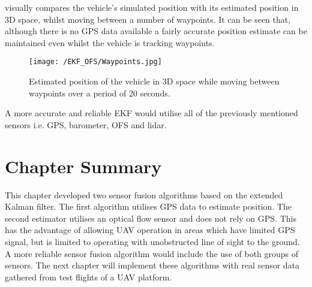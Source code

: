  visually compares the vehicle's simulated position with its estimated position in 3D space, whilst moving between a number of waypoints. It can be seen that, although there is no GPS data available a fairly accurate position estimate can be maintained even whilst the vehicle is tracking waypoints.
\begin{figure}[htb]
\begin{center}
	\texttt{[image: /EKF\_OFS/Waypoints.jpg]}\\
	\end{center}
	\caption{Estimated position of the vehicle in 3D space while moving between waypoints over a period of 20 seconds.}%
	\label{fig:EKF_OFS_3D}%
\end{figure}


A more accurate and reliable EKF would utilise all of the previously mentioned sensors i.e. GPS, barometer, OFS and lidar. 

\FloatBarrier

\section{Chapter Summary}
This chapter developed two sensor fusion algorithms based on the extended Kalman filter. The first algorithm utilises GPS data to estimate position. The second estimator utilises an optical flow sensor and does not rely on GPS. This has the advantage of allowing UAV operation in areas which have limited GPS signal, but is limited to operating with unobstructed line of sight to the ground. A more reliable sensor fusion algorithm would include the use of both groups of sensors. The next chapter will implement these algorithms with real sensor data gathered from test flights of a UAV platform.

\clearpage


